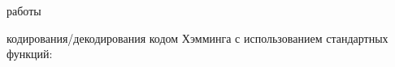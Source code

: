 \documentclass[a4paper,12pt]{article}
\begin{document}
{ работы}
\begin{enumerate}
{ кодирования/декодирования кодом Хэмминга с использованием стандартных функций:
\\}


\end{enumerate}
\end{document}
